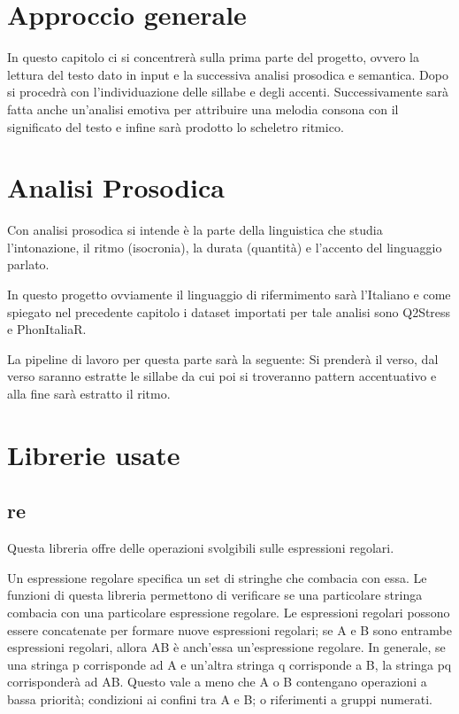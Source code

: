 \section{Approccio generale}
In questo capitolo ci si concentrerà sulla prima parte del progetto, ovvero la lettura del testo dato in input e la successiva analisi prosodica e semantica. Dopo si procedrà con l'individuazione delle sillabe e degli accenti.
Successivamente sarà fatta anche un'analisi emotiva per attribuire una melodia consona con il significato del testo e infine sarà prodotto lo scheletro ritmico.
\section{Analisi Prosodica}
Con analisi prosodica si intende è la parte della linguistica che studia l'intonazione, il ritmo (isocronia), la durata (quantità) e l'accento del linguaggio parlato.

In questo progetto ovviamente il linguaggio di rifermimento sarà l'Italiano e come spiegato nel precedente capitolo i dataset importati per tale analisi sono Q2Stress e PhonItaliaR.

La pipeline di lavoro per questa parte sarà la seguente: Si prenderà il verso, dal verso saranno estratte le sillabe da cui poi si troveranno pattern accentuativo e alla fine sarà estratto il ritmo.

\section{Librerie usate}
\subsection{re}
Questa libreria offre delle operazioni svolgibili sulle espressioni regolari.

Un espressione regolare specifica un set di stringhe che combacia con essa. Le funzioni di questa libreria permettono di verificare se una particolare stringa combacia con una particolare espressione regolare.
Le espressioni regolari possono essere concatenate per formare nuove espressioni regolari; se A e B sono entrambe espressioni regolari, allora AB è anch'essa un'espressione regolare. In generale, se una stringa p corrisponde ad A e un'altra stringa q corrisponde a B, la stringa pq corrisponderà ad AB. Questo vale a meno che A o B contengano operazioni a bassa priorità; condizioni ai confini tra A e B; o riferimenti a gruppi numerati. 

